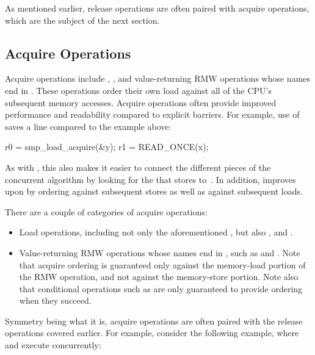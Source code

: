 As mentioned earlier, release operations are often paired with acquire
operations, which are the subject of the next section.


\subsection{Acquire Operations}

Acquire operations include , ,
and value-returning RMW operations whose names end in .
These operations order their own load against all of the CPU's subsequent
memory accesses.
Acquire operations often provide improved performance and readability
compared to explicit barriers.
For example, use of  saves a line compared to the
 example above:

\begin{VerbatimU}
	r0 = smp_load_acquire(&y);
	r1 = READ_ONCE(x);
\end{VerbatimU}

As with , this also makes it easier to connect
the different pieces of the concurrent algorithm by looking for the
 that stores to~.
In addition,  improves upon  by
ordering against subsequent stores as well as against subsequent loads.

There are a couple of categories of acquire operations:

\begin{itemize}
 \item	Load operations, including not only the aforementioned
	, but also , and
	.

 \item	Value-returning RMW operations whose names end in ,
	such as  and .
	Note that acquire ordering is guaranteed only against the
	memory-load portion of the RMW operation, and not against the
	memory-store portion.
	Note also that conditional operations such as
	 are only guaranteed to provide
	ordering when they succeed.
\end{itemize}

Symmetry being what it is, acquire operations are often paired with the
release operations covered earlier.
For example, consider the following example, where  and
 execute concurrently:

